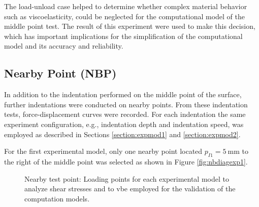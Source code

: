 The load-unload case helped to determine whether complex material behavior such as 
viscoelasticity, could be neglected for the computational model of the middle point test.
The result of this experiment were used to make this decision, which has important 
implications for the simplification of the computational model and its accuracy and reliability.

\subsection*{Nearby Point (NBP)}
\label{subsection:nearbypoint}
In addition to the indentation performed on the middle point of the surface, further 
indentations were conducted on nearby points. From these indentation tests, force-displacement 
curves were recorded. For each indentation the same experiment configuration, 
e.g., indentation depth and indentation 
speed, was employed as described in Sections \ref{section:expmod1} and \ref{section:expmod2}.

For the first experimental model, only one nearby point located $p_{I1} = \SI{5}{\milli \m}$ 
to the right of the middle point was selected as shown in Figure \ref{fig:nbdiagexp1}.

\begin{figure}%
    \centering
   \qquad
   \caption{Nearby test point: Loading points for each experimental model to analyze shear stresses and to vbe employed for the validation of the computation models.}%
   \label{fig:nbexp}%
\end{figure}

